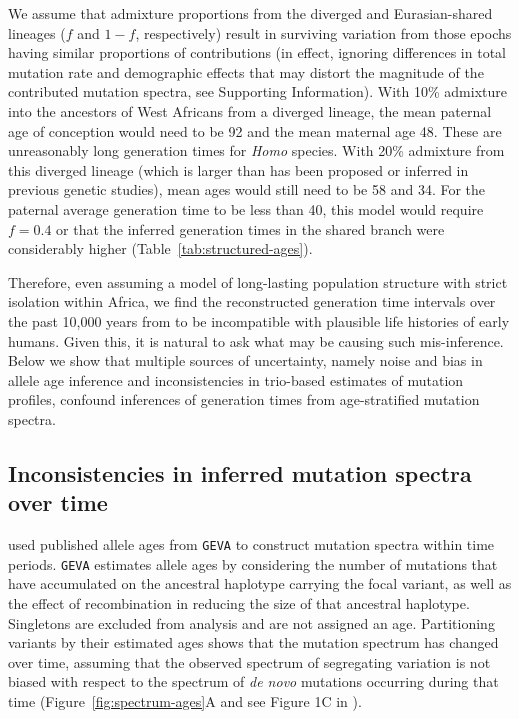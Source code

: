 \documentclass[]{article}
\newcommand{\GEVA}{\texttt{GEVA}\xspace}
\begin{document}
We assume that admixture proportions from the diverged and Eurasian-shared
lineages ($f$ and $1-f$, respectively) result in surviving variation from those
epochs having similar proportions of contributions (in effect, ignoring
differences in total mutation rate and demographic effects that may distort
the magnitude of the contributed mutation spectra, see Supporting Information).
With 10\% admixture into the ancestors of West Africans from a diverged
lineage, the mean paternal age of conception would need to be 92 and the mean
maternal age 48.  These are unreasonably long generation times for \emph{Homo}
species. With 20\% admixture from this diverged lineage (which is larger than
has been proposed or inferred in previous genetic studies), mean ages would
still need to be 58 and 34. For the paternal average generation time to be less
than 40, this model would require $f=0.4$ or that the inferred generation times
in the shared branch were considerably higher
(Table~\ref{tab:structured-ages}).

Therefore, even assuming a model of long-lasting population structure with
strict isolation within Africa, we find the reconstructed generation time
intervals over the past 10,000 years from \citet{wang2023human} to be
incompatible with plausible life histories of early humans. Given this, it is
natural to ask what may be causing such mis-inference. Below we show that
multiple sources of uncertainty, namely noise and bias in allele age inference
and inconsistencies in trio-based estimates of mutation profiles, confound
inferences of generation times from age-stratified mutation spectra.

\subsection*{Inconsistencies in inferred mutation spectra over time}

\citet{wang2023human} used
published allele ages from \GEVA \citep{albers2020dating}
to construct mutation spectra within time periods. \GEVA estimates
allele ages by considering the number of mutations that have accumulated on the
ancestral haplotype carrying the focal variant, as well as the effect of
recombination in reducing the size of that ancestral haplotype. Singletons are
excluded from analysis and are not assigned an age. Partitioning variants by
their estimated ages shows that the mutation spectrum has changed over time,
assuming that the observed spectrum of segregating variation is not biased with
respect to the spectrum of \emph{de novo} mutations occurring during that time
(Figure~\ref{fig:spectrum-ages}A and see Figure 1C in \citet{wang2023human}).
\end{document}
